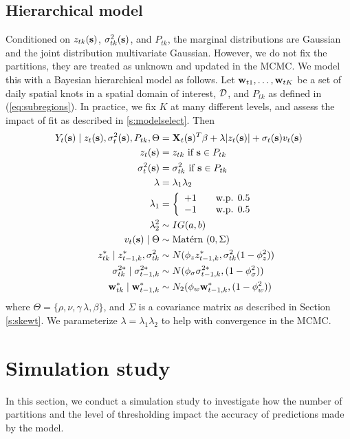 \documentclass[11pt]{article}
\begin{document}
\subsection{Hierarchical model}\label{s:hier}
Conditioned on $z_{tk}(\mbox{\bf s})$, $\sigma^2_{tk}(\mbox{\bf s})$, and $P_{tk}$, the marginal distributions are Gaussian and the joint distribution multivariate Gaussian.
However, we do not fix the partitions, they are treated as unknown and updated in the MCMC.
We model this with a Bayesian hierarchical model as follows.
Let $\mbox{\bf w}_{t1}, \ldots, \mbox{\bf w}_{tK}$ be a set of daily spatial knots in a spatial domain of interest, ${\cal D}$, and $P_{tk}$ as defined in (\ref{eq:subregions}).
In practice, we fix $K$ at many different levels, and assess the impact of fit as described in \ref{s:modelselect}.
Then
\begin{align}
   Y_t(\mbox{\bf s}) \mid z_{t}(\mbox{\bf s}), \sigma_t^2(\mbox{\bf s}), P_{tk}, \Theta &= \mbox{\bf X}_t(\mbox{\bf s})^T \beta + \lambda |z_t(\mbox{\bf s})| + \sigma_t(\mbox{\bf s}) v_t(\mbox{\bf s}) \label{eq:hier}\\
   z_t(\mbox{\bf s}) &= z_{tk} \text{ if } \mbox{\bf s} \in P_{tk}\nonumber\\
   \sigma^2_{t}(\mbox{\bf s}) &= \sigma^2_{tk} \text{ if } \mbox{\bf s} \in P_{tk}\nonumber\\
   \lambda &= \lambda_1 \lambda_2\nonumber\\
   \lambda_1 &= \left\{ \begin{array}{ll}
      +1 \quad & \text{w.p. } 0.5\\
      -1 \quad & \text{w.p. } 0.5
   \end{array}\right.\nonumber\\
   \lambda^2_2 & \sim IG(a, b)\nonumber\\
   v_t(\mbox{\bf s}) \mid \Theta &\sim \mbox{Mat$\acute{\mbox{e}}$rn }(0, \Sigma)\nonumber\\
   z^*_{tk} \mid z^*_{t-1, k}, \sigma^2_{tk} &\sim N(\phi_z z^*_{t-1, k}, \sigma^2_{tk} (1 - \phi_z^2))\nonumber\\
   \sigma^{2*}_{tk} \mid \sigma^{2*}_{t-1, k} &\sim N(\phi_\sigma \sigma^{2*}_{t-1, k}, (1 - \phi_\sigma^2))\nonumber\\
   \mbox{\bf w}^*_{tk} \mid \mbox{\bf w}^*_{t-1, k} &\sim N_2(\phi_w \mbox{\bf w}^*_{t-1, k}, (1 - \phi_w^2)) \nonumber
\end{align}
where $\Theta = \{\rho, \nu, \gamma\, \lambda, \beta\}$, and $\Sigma$ is a \Matern covariance matrix as described in Section \ref{s:skewt}.
We parameterize $\lambda = \lambda_1 \lambda_2$ to help with convergence in the MCMC.

\section{Simulation study}\label{s:simstudy}
In this section, we conduct a simulation study to investigate how the number of partitions and the level of thresholding impact the accuracy of predictions made by the model.
\end{document}
